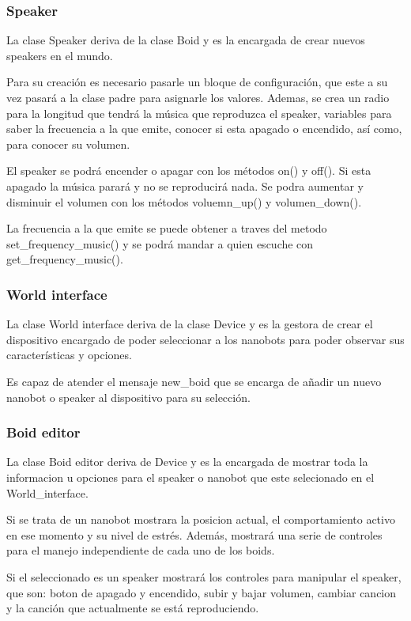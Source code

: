 \subsubsection{Speaker}
\label{sec:speaker}

La clase Speaker deriva de la clase Boid y es la encargada de crear nuevos speakers en el mundo.

Para su creación es necesario pasarle un bloque de configuración, que este a su vez pasará a la clase padre para asignarle los valores. Ademas, se crea un radio para la longitud que tendrá la música que reproduzca el speaker, variables para saber la frecuencia a la que emite, conocer si esta apagado o encendido, así como, para conocer su volumen.

El speaker se podrá encender o apagar con los métodos on() y off(). Si esta apagado la música parará y no se reproducirá nada. Se podra aumentar y disminuir el volumen con los métodos voluemn\_up() y volumen\_down().

La frecuencia a la que emite se puede obtener a traves del metodo set\_frequency\_music() y se podrá mandar a quien escuche con get\_frequency\_music().

\subsubsection{World interface}
\label{sec:world_interface}
La clase World interface deriva de la clase Device y es la gestora de crear el dispositivo encargado de poder seleccionar a los nanobots para poder observar sus características y opciones.

Es capaz de atender el mensaje new\_boid que se encarga de añadir un nuevo nanobot o speaker al dispositivo para su selección. 

\subsubsection{Boid editor}
\label{sec:boid_editor}
La clase Boid editor deriva de Device y es la encargada de mostrar toda la informacion u opciones para el speaker o nanobot que este selecionado en el World\_interface. 

Si se trata de un nanobot mostrara la posicion actual, el comportamiento activo en ese momento y su nivel de estrés. Además, mostrará una serie de controles para el manejo independiente de cada uno de los boids.

Si el seleccionado es un speaker mostrará los controles para manipular el speaker, que son: boton de apagado y encendido, subir y bajar volumen, cambiar cancion y la canción que actualmente se está reproduciendo.  

